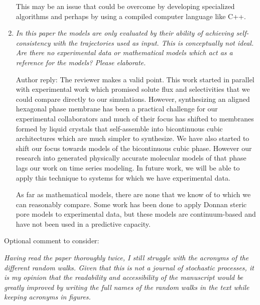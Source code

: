 \documentclass{article}
\begin{document}
\begin{enumerate}[label={Comment \theenumi :}, leftmargin=3.9\parindent]
	  	This may be an issue that could be overcome by developing specialized algorithms and perhaps 
	  	by using a compiled computer language like C++. 
	  	  

  \item \textit{In this paper the models are only evaluated by their ability of achieving 
		  self-consistency with the trajectories used as input. This is conceptually not ideal. 
		  Are there no experimental data or mathematical models which act as a reference for 
		  the models? Please elaborate.}
		  
		  Author reply: The reviewer makes a valid point. This work started in parallel with experimental
		  work which promised solute flux and selectivities that we could compare directly to our
		  simulations. However, synthesizing an aligned hexagonal phase membrane has been a practical
		  challenge for our experimental collaborators and much of their focus has shifted to 
		  membranes formed by liquid crystals that self-assemble into bicontinuous cubic architectures
		  which are much simpler to synthesize. We have also started to shift our focus towards models 
		  of the bicontinuous cubic phase. However our research into generated physically accurate 
		  molecular models of that phase lags our work on time series modeling. In future work, we will
		  be able to apply this technique to systems for which we have experimental data.
		  
		  As far as mathematical models, there are none that we know of to which we can reasonably
		  compare. Some work has been done to apply Donnan steric pore models to experimental data, 
		  but these models are continuum-based and have not been used in a predictive capacity.
		  
  \end{enumerate}

\noindent Optional comment to consider:\\
\begin{addmargin}[5.8em]{0em}
	\textit{Having read the paper thoroughly twice, I still struggle with the acronyms of the different random
	walks. Given that this is not a journal of stochastic processes, it is my opinion that the readability
	and accessibility of the manuscript would be greatly improved by writing the full names of the
	random walks in the text while keeping acronyms in figures. \\}

	
\end{addmargin}
\end{document}
